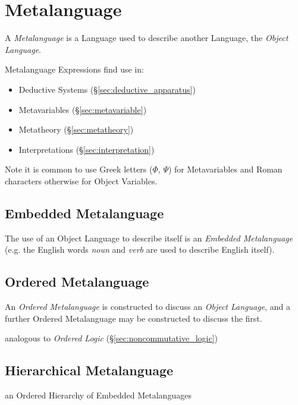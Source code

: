 \section{Metalanguage}\label{sec:metalanguage}

A \emph{Metalanguage} is a Language used to describe another Language,
the \emph{Object Language}.

Metalanguage Expressions find use in:
\begin{itemize}
    \item Deductive Systems (\S\ref{sec:deductive_apparatus})
    \item Metavariables (\S\ref{sec:metavariable})
    \item Metatheory (\S\ref{sec:metatheory})
    \item Interpretations (\S\ref{sec:interpretation})
\end{itemize}

Note it is common to use Greek letters ($\Phi$, $\Psi$) for
Metavariables and Roman characters otherwise for Object Variables.



\subsection{Embedded Metalanguage}\label{sec:embedded_metalanguage}

The use of an Object Language to describe itself is an \emph{Embedded
  Metalanguage} (e.g. the English words \emph{noun} and \emph{verb}
are used to describe English itself).



\subsection{Ordered Metalanguage}\label{sec:ordered_metalanguage}

An \emph{Ordered Metalanguage} is constructed to discuss an
\emph{Object Language}, and a further Ordered Metalanguage may be
constructed to discuss the first.

analogous to \emph{Ordered Logic}
(\S\ref{sec:noncommutative_logic})



\subsection{Hierarchical Metalanguage}\label{sec:hierarchical_metalanguage}

an Ordered Hierarchy of Embedded Metalanguages
